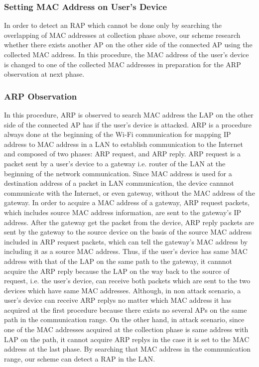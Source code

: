 \documentclass[conference]{IEEEtran}
\begin{document}
\subsubsection{Setting MAC Address on User's Device}
In order to detect an RAP which cannot be done only by searching the overlapping of MAC addresses at collection phase above, our scheme research whether there exists another AP on the other side of the connected AP using the collected MAC address.
In this procedure, the MAC address of the user's device is changed to one of the collected MAC addresses in preparation for the ARP observation at next phase.

\subsubsection{ARP Observation}
In this procedure, ARP is observed to search MAC address the LAP on the other side of the connected AP has if the user's device is attacked.
ARP is a procedure always done at the beginning of the Wi-Fi communication for mapping IP address to MAC address in a LAN to establish communication to the Internet and composed of two phases: ARP request, and ARP reply.
ARP request is a packet sent by a user's device to a gateway i.e. router of the LAN at the beginning of the network communication.
Since MAC address is used for a destination address of a packet in LAN communication, the device cannnot communicate with the Internet, or even gateway, without the MAC address of the gateway.
In order to acquire a MAC address of a gateway, ARP request packets, which includes source MAC address information, are sent to the gateway's IP address. 
After the gateway get the packet from the device, ARP reply packets are sent by the gateway to the source device on the basis of the source MAC address included in ARP request packets, which can tell the gateway's MAC address by including it as a source MAC address.
Thus, if the user's device has same MAC address with that of the LAP on the same path to the gateway, it cannnot acquire the ARP reply because the LAP on the way back to the source of request, i.e. the user's device, can receive both packets which are sent to the two devices which have same MAC addresses.
Although, in non attack scenario, a user's device can receive ARP replys no matter which MAC address it has acquired at the first procedure because there exists no several APs on the same path in the communication range.
On the other hand, in attack scenario, since one of the MAC addresses acquired at the collection phase is same address with LAP on the path, it cannot acquire ARP replys in the case it is set to the MAC address at the last phase.
By searching that MAC address in the communication range, our scheme can detect a RAP in the LAN. 
\end{document}
